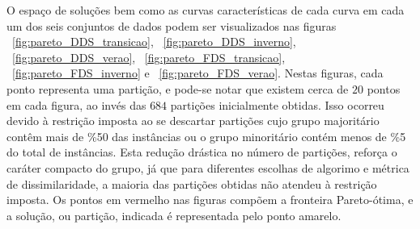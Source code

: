 O espaço de soluções bem como as curvas características de cada curva em cada um dos seis conjuntos de dados podem ser visualizados nas figuras ~\ref{fig:pareto_DDS_transicao}, ~\ref{fig:pareto_DDS_inverno}, ~\ref{fig:pareto_DDS_verao}, ~\ref{fig:pareto_FDS_transicao}, ~\ref{fig:pareto_FDS_inverno} e ~\ref{fig:pareto_FDS_verao}. Nestas figuras, cada ponto representa uma partição, e pode-se notar que existem cerca de $20$ pontos em cada figura, ao invés das $684$ partições inicialmente obtidas. Isso ocorreu devido à restrição imposta ao se descartar partições cujo grupo majoritário contêm mais de \%50 das instâncias ou o grupo minoritário contém menos de \%5 do total de instâncias. Esta redução drástica no número de partições, reforça o caráter compacto do grupo, já que para diferentes escolhas de algorimo e métrica de dissimilaridade, a maioria das partições obtidas não atendeu à restrição imposta. Os pontos em vermelho nas figuras compõem a fronteira Pareto-ótima, e a solução, ou partição, indicada é representada pelo ponto amarelo.


